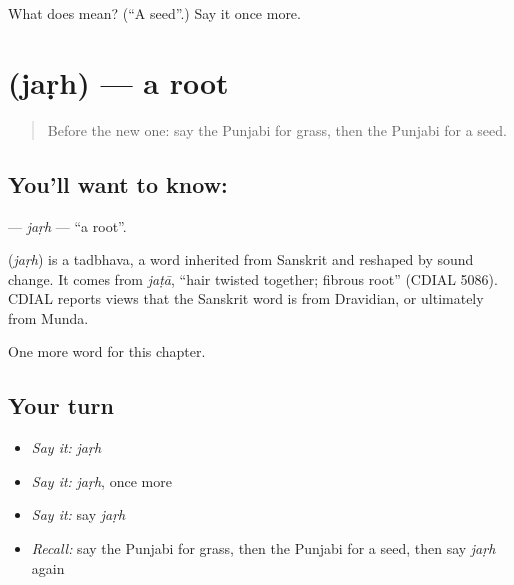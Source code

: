 \begin{tcolorbox}[breakable,colback=teal!4,colframe=teal!35!black,title={Before you move on}]
What does  mean? (\textquotedblleft{}A seed\textquotedblright{}.) Say it once more.
\end{tcolorbox}
\section[\texorpdfstring{\pa{ਜੜ੍ਹ} (jaṛh)}{ਜੜ੍ਹ (jaṛh)}]{ (jaṛh) — a root}

\label{lesson:PA-C126-jarh}



\begin{quote}
Before the new one: say the Punjabi for grass, then the Punjabi for a seed.
\end{quote}

\subsection*{You'll want to know: }
\textbf{} — \emph{jaṛh} — \textquotedblleft{}a root\textquotedblright{}.

\begin{cousinweb}
\textbf{} (\emph{jaṛh}) is a tadbhava, a word inherited from Sanskrit and reshaped by sound change. It comes from \emph{jaṭā}, \textquotedblleft{}hair twisted together; fibrous root\textquotedblright{} (CDIAL 5086). CDIAL reports views that the Sanskrit word is from Dravidian, or ultimately from Munda.
\end{cousinweb}

\begin{grammarlens}[title={What you've built}]
One more word for this chapter.
\end{grammarlens}

\subsection*{Your turn}
\begin{itemize}
\raggedright
  \item \emph{Say it:} \emph{jaṛh}
  \item \emph{Say it:} \emph{jaṛh}, once more
  \item \emph{Say it:} say \emph{jaṛh}
  \item \emph{Recall:} say the Punjabi for grass, then the Punjabi for a seed, then say \emph{jaṛh} again
\end{itemize}

